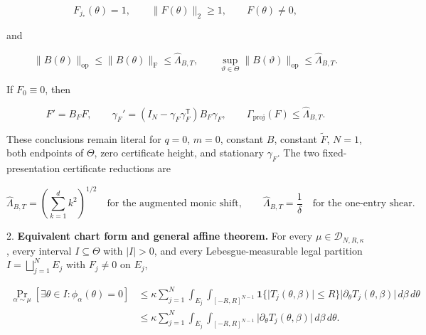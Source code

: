 \begin{proposition}
\begin{equation}
\label{eq:appendix-indented-034}
   F_{j_*}(\theta)=1,
   \qquad \lVert F(\theta)\rVert_2\geq1,
   \qquad F(\theta)\neq0,
\end{equation}
   
   and
   
\begin{equation}
\label{eq:appendix-indented-035}
   \lVert B(\theta)\rVert_{\mathrm{op}}
   \leq\lVert B(\theta)\rVert_{\mathrm F}
   \leq\widehat\Lambda_{B,T},
   \qquad
   \sup_{\vartheta\in\Theta}\lVert B(\vartheta)\rVert_{\mathrm{op}}
   \leq\widehat\Lambda_{B,T}.
\end{equation}
   
   If \(F_0\equiv0\), then
   
\begin{equation}
\label{eq:appendix-indented-036}
   F'=B_FF,
   \qquad
   \gamma_F'
   =(I_N-\gamma_F\gamma_F^{\mathsf T})B_F\gamma_F,
   \qquad
   \Gamma_{\mathrm{proj}}(F)\leq\widehat\Lambda_{B,T}.
\end{equation}

   These conclusions remain literal for \(q=0\), \(m=0\), constant \(B\), constant \(\widetilde F\),
   \(N=1\), both endpoints of \(\Theta\), zero certificate height, and stationary \(\gamma_F\). The two
   fixed-presentation certificate reductions are

\begin{equation}
\label{eq:appendix-indented-037}
   \widehat\Lambda_{B,T}=\left(\sum_{k=1}^d k^2\right)^{1/2}
   \quad\text{for the augmented monic shift},
   \qquad
   \widehat\Lambda_{B,T}=\frac1\delta
   \quad\text{for the one-entry shear}.
\end{equation}

2. \textbf{Equivalent chart form and general affine theorem.} For every
   \(\mu\in\mathcal D_{N,R,\kappa}\), every interval \(I\subseteq\Theta\) with
   \(\lvert I\rvert>0\), and every Lebesgue-measurable legal partition
   \(I=\bigsqcup_{j=1}^N E_j\) with \(F_j\neq0\) on \(E_j\),
   
\begin{equation}
\label{eq:appendix-indented-038}
   \begin{aligned}
   \Pr_{\alpha\sim\mu}[\exists\theta\in I:\phi_\alpha(\theta)=0]
   &\leq
   \kappa\sum_{j=1}^{N}\int_{E_j}\int_{[-R,R]^{N-1}}
   \mathbf 1\{\lvert T_j(\theta,\beta)\rvert\leq R\}
   \lvert\partial_\theta T_j(\theta,\beta)\rvert\,d\beta\,d\theta\\
   &\leq
   \kappa\sum_{j=1}^{N}\int_{E_j}\int_{[-R,R]^{N-1}}
   \lvert\partial_\theta T_j(\theta,\beta)\rvert\,d\beta\,d\theta.
   \end{aligned}
\end{equation}
   

\end{proposition}
